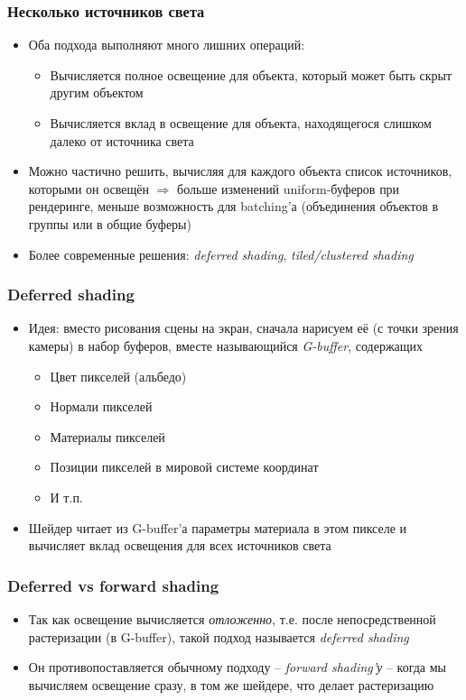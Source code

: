 \documentclass[10pt]{beamer}
\begin{document}
\begin{frame}[fragile]
\frametitle{Несколько источников света}
\begin{itemize}
\item Оба подхода выполняют много лишних операций:
\pause
\begin{itemize}
\item Вычисляется полное освещение для объекта, который может быть скрыт другим объектом
\pause
\item Вычисляется вклад в освещение для объекта, находящегося слишком далеко от источника света
\end{itemize}
\pause
\item Можно частично решить, вычисляя для каждого объекта список источников, которыми он освещён \begin{math}\Longrightarrow\end{math} больше изменений uniform-буферов при рендеринге, меньше возможность для batching'а (объединения объектов в группы или в общие буферы)
\pause
\item Более современные решения: \textit{deferred shading}, \textit{tiled/clustered shading}
\end{itemize}
\end{frame}

\begin{frame}[fragile]
\frametitle{Deferred shading}
\begin{itemize}
\item Идея: вместо рисования сцены на экран, сначала нарисуем её (с точки зрения камеры) в набор буферов, вместе называющийся \textit{G-buffer}, содержащих
\begin{itemize}
\item Цвет пикселей (альбедо)
\item Нормали пикселей
\item Материалы пикселей
\item Позиции пикселей в мировой системе координат
\item И т.п.
\end{itemize}
\pause
\item Шейдер читает из G-buffer'а параметры материала в этом пикселе и вычисляет вклад освещения для всех источников света
\end{itemize}
\end{frame}

\begin{frame}[fragile]
\frametitle{Deferred vs forward shading}
\begin{itemize}
\item Так как освещение вычисляется \textit{отложенно}, т.е. после непосредственной растеризации (в G-buffer), такой подход называется \textit{deferred shading}
\pause
\item Он противопоставляется обычному подходу -- \textit{forward shading'у} -- когда мы вычисляем освещение сразу, в том же шейдере, что делает растеризацию
\end{itemize}
\end{frame}
\end{document}

